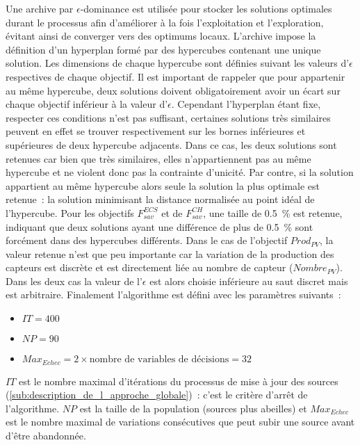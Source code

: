 Une archive par $\epsilon$-dominance est utilisée pour stocker les solutions optimales
durant le processus afin d’améliorer à la fois l’exploitation et l’exploration, évitant
ainsi de converger vers des optimums locaux. L’archive impose la définition d’un
hyperplan formé par des hypercubes contenant une unique solution. Les dimensions de chaque
hypercube sont définies suivant les valeurs d’$\epsilon$ respectives de chaque objectif.
Il est important de rappeler que pour appartenir au même hypercube, deux solutions
doivent obligatoirement avoir un écart sur chaque objectif inférieur à la valeur d’$\epsilon$.
Cependant l’hyperplan étant fixe, respecter ces conditions n’est pas suffisant, certaines solutions
très similaires peuvent en effet se trouver respectivement sur les bornes inférieures
et supérieures de deux hypercube adjacents. Dans ce cas, les deux solutions sont retenues
car bien que très similaires, elles n’appartiennent pas au même hypercube et ne violent donc
pas la contrainte d’unicité.
Par contre, si la solution appartient au même hypercube alors seule la solution la plus
optimale est retenue~: la solution minimisant la distance normalisée au point idéal de l’hypercube.
Pour les objectifs $F_{sav}^{ECS}$ et de $F_{sav}^{CH}$, une taille de \SI{0.5}{\percent}
est retenue, indiquant que deux solutions ayant une différence de plus de
\SI{0.5}{\percent} sont forcément dans des hypercubes différents. Dans le cas de l’objectif $Prod_{PV}$, la
valeur retenue n’est que peu importante car la variation de la production des capteurs
 est discrète et est directement liée au nombre de capteur  ($Nombre_{PV}$).
Dans les deux cas la valeur de l’$\epsilon$ est alors choisie inférieure au saut discret
mais est arbitraire. Finalement l’algorithme est défini avec les paramètres suivants~:
\begin{itemize}
  \item $IT = 400$
  \item $NP = 90$
  \item $Max_{Echec} = 2 \times \text{nombre de variables de décisions} = 32$
\end{itemize}

$IT$ est le nombre maximal d’itérations du processus de mise à jour des sources
(\ref{sub:description_de_l_approche_globale})~: c’est le critère d’arrêt de l’algorithme.
$NP$ est la taille de la population (sources plus abeilles) et $Max_{Echec}$ est le nombre
maximal de variations consécutives que peut subir une source avant d’être abandonnée.

